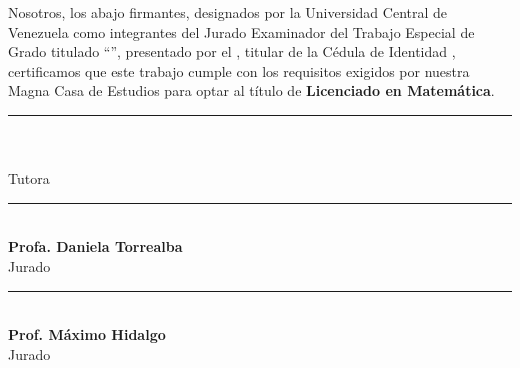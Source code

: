 \thispagestyle{plain}
\setcounter{page}{2}   %

\vspace*{0.5cm}

\noindent
Nosotros, los abajo firmantes, designados por la Universidad Central de Venezuela como integrantes del Jurado Examinador del Trabajo Especial de Grado titulado ``\titulotrabajo'', presentado por el \autortrabajo, titular de la C\'edula de Identidad \textbf{\cedulaautor}, certificamos que este trabajo cumple con los requisitos exigidos por nuestra Magna Casa de Estudios para optar al t\'itulo de \textbf{Licenciado en Matem\'atica}.

\vspace{2.2cm}

\newcommand{\firma}[2]{%
  \begin{center}
  \rule{7cm}{0.5pt}\\[4pt]
  {\bfseries #1}\\[2pt]
  #2
  \end{center}
}

\firma{\tutortrabajo}{Tutora}

\vspace{1.4cm}

\firma{Profa. Daniela Torrealba}{Jurado}

\vspace{1.4cm}

\firma{Prof. Máximo Hidalgo}{Jurado}

\clearpage
